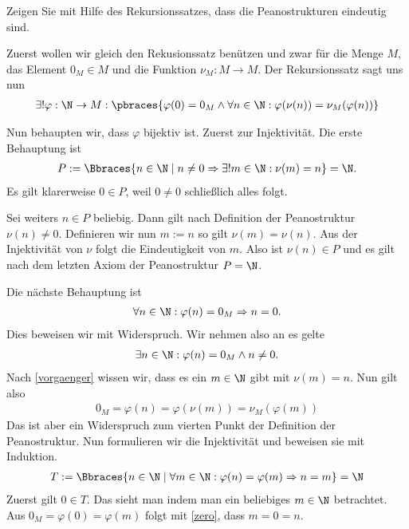 \begin{exercise}
    Zeigen Sie mit Hilfe des Rekursionssatzes, dass die Peanostrukturen eindeutig sind.
\end{exercise}
\begin{solution}
    Zuerst wollen wir gleich den Rekusionssatz benützen und zwar für die Menge $M$, das Element $0_M \in M$ und die Funktion $\nu_M: M \to M$. Der Rekursionssatz sagt uns nun
    \begin{align*}
        \exists! \varphi: \N \to M : \pbraces{\varphi(0) = 0_M \land \forall n \in \N : \varphi(\nu(n)) = \nu_M(\varphi(n))}
    \end{align*}

    Nun behaupten wir, dass $\varphi$ bijektiv ist. Zuerst zur Injektivität. 
    Die erste Behauptung ist
    \begin{align}\label{vorgaenger}
       P := \Bbraces{n \in \N \mid n \neq 0 \Rightarrow \exists! m \in \N: \nu(m) = n} = \N.
    \end{align}
    Es gilt klarerweise $0 \in P$, weil $0 \neq 0$ schließlich alles folgt. 
    
    Sei weiters $n \in P$ beliebig. Dann gilt nach Definition der Peanostruktur $\nu(n) \neq 0$. Definieren wir nun $m := n$ so gilt $\nu(m) = \nu(n)$. Aus der Injektivität von $\nu$ folgt die Eindeutigkeit von $m$. Also ist $\nu(n) \in P$ und es gilt nach dem letzten Axiom der Peanostruktur $P = \N$.

    Die nächste Behauptung ist
    \begin{align}\label{zero}
        \forall n \in \N: \varphi(n) = 0_M \Rightarrow n = 0.
    \end{align}
    Dies beweisen wir mit Widerspruch. Wir nehmen also an es gelte
    \begin{align*}
        \exists n \in \N: \varphi(n) = 0_M \land n \neq 0.
    \end{align*}
    Nach \eqref{vorgaenger} wissen wir, dass es ein $m \in \N$ gibt mit $\nu(m) = n$. Nun gilt also 
    \begin{align*}
        0_M = \varphi(n) = \varphi(\nu(m)) = \nu_M(\varphi(m))
    \end{align*}
    Das ist aber ein Widerspruch zum vierten Punkt der Definition der Peanostruktur.
    Nun formulieren wir die Injektivität und beweisen sie mit Induktion.
    \begin{align*}
        T:= \Bbraces{n \in \N \mid \forall m \in \N: \varphi(n) = \varphi(m) \Rightarrow n = m} = \N
    \end{align*}
    Zuerst gilt $0 \in T$. Das sieht man indem man ein beliebiges $m \in \N$ betrachtet. Aus $0_M = \varphi(0) = \varphi(m)$ folgt mit \eqref{zero}, dass $m = 0 = n$.


\end{solution}
